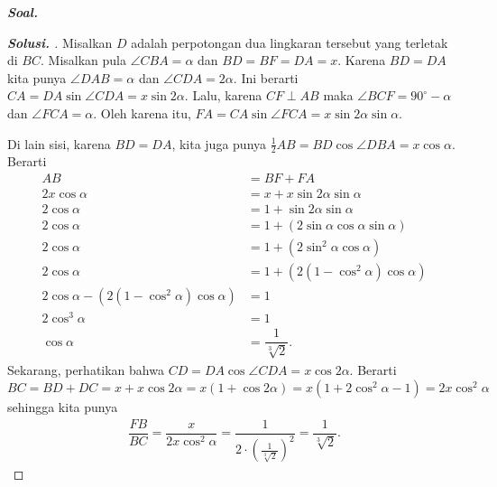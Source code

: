 \textbf{\textit{Soal. }}

\begin{proof}[\textbf{Solusi. }] Misalkan $D$ adalah perpotongan dua lingkaran tersebut yang terletak di $BC$. Misalkan pula $\angle CBA = \alpha$ dan $BD=BF=DA=x$. Karena $BD=DA$ kita punya $\angle DAB = \alpha$ dan $\angle CDA = 2\alpha$. Ini berarti $CA = DA \sin \angle CDA = x \sin 2\alpha$. Lalu, karena $CF \perp AB$ maka $\angle BCF = 90^\circ-\alpha$ dan $\angle FCA=\alpha$. Oleh karena itu, $FA = CA \sin \angle FCA = x\sin 2\alpha \sin \alpha$.
    

Di lain sisi, karena $BD=DA$, kita juga punya $\frac{1}{2}AB = BD \cos \angle DBA = x \cos \alpha$. Berarti
\begin{align*}
    AB &= BF + FA\\
    2x \cos \alpha &= x + x\sin 2\alpha \sin \alpha\\
    2 \cos \alpha &= 1 + \sin 2\alpha \sin \alpha\\
    2 \cos \alpha &= 1 + (2\sin \alpha \cos \alpha \sin \alpha)\\
    2 \cos \alpha &= 1 + (2\sin^2 \alpha \cos \alpha)\\
    2 \cos \alpha &= 1 + (2(1 - \cos^2 \alpha) \cos \alpha)\\
    2 \cos \alpha - (2(1 - \cos^2 \alpha) \cos \alpha) &= 1 \\
    2\cos^3 \alpha &= 1\\
    \cos \alpha &= \dfrac{1}{\sqrt[3]{2}}.
\end{align*}
Sekarang, perhatikan bahwa $CD = DA \cos \angle CDA = x \cos 2\alpha$. Berarti $BC=BD+DC=x+x\cos2\alpha=x(1+\cos2\alpha)=x(1+2\cos^2\alpha-1)=2x\cos^2\alpha$ sehingga kita punya
\begin{align*}
    \dfrac{FB}{BC} = \dfrac{x}{2x\cos^2\alpha}=\dfrac{1}{2\cdot\left(\frac{1}{\sqrt[3]{2}}\right)^2}=\dfrac{1}{\sqrt[3]{2}}.
\end{align*}
\end{proof}